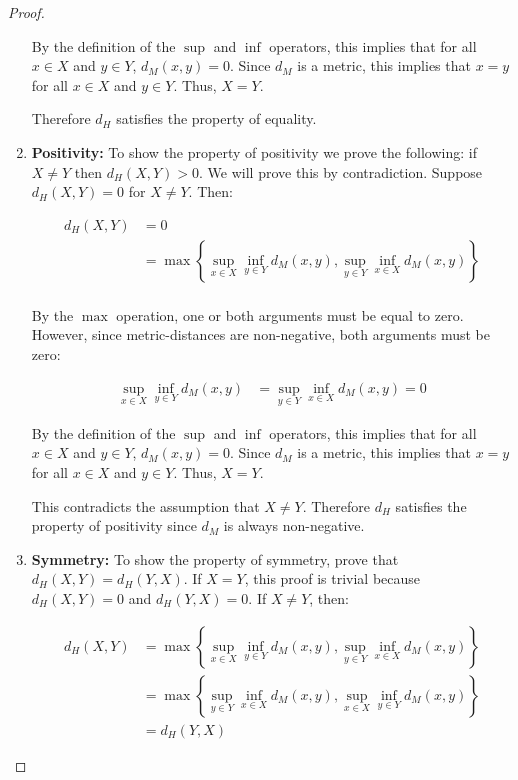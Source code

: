 \documentclass{article}
\begin{document}
\begin{proof}
\begin{enumerate}
        By the definition of the $\sup$ and $\inf$ operators, this implies that for all $x \in X$ and $y \in Y$, $d_M(x,y) = 0$. Since $d_M$ is a metric, this implies that $x=y$ for all $x \in X$ and $y \in Y$. Thus, $X=Y$.

        Therefore $d_H$ satisfies the property of equality.

    \item \textbf{Positivity:}
        To show the property of positivity we prove the following: if $X \neq Y$ then $d_H(X,Y) > 0$. We will prove this by contradiction. Suppose $d_H(X,Y) = 0$ for $X \neq Y$. Then:

        \begin{align*}
            d_H(X,Y) &= 0 \\
            &= \max \left\{ \sup_{x \in X} \inf_{y \in Y} d_M(x,y), \sup_{y \in Y} \inf_{x \in X} d_M(x,y) \right\} \\
        \end{align*}

        By the $\max$ operation, one or both arguments must be equal to zero. However, since metric-distances are non-negative, both arguments must be zero:

        \begin{align*}
            \sup_{x \in X} \inf_{y \in Y} d_M(x,y) &= \sup_{y \in Y} \inf_{x \in X} d_M(x,y) = 0
        \end{align*}

        By the definition of the $\sup$ and $\inf$ operators, this implies that for all $x \in X$ and $y \in Y$, $d_M(x,y) = 0$. Since $d_M$ is a metric, this implies that $x=y$ for all $x \in X$ and $y \in Y$. Thus, $X=Y$.

        This contradicts the assumption that $X \neq Y$. Therefore $d_H$ satisfies the property of positivity since $d_M$ is always non-negative.
    
    \item \textbf{Symmetry:}
        To show the property of symmetry, prove that $d_H(X,Y) = d_H(Y,X)$. If $X = Y$, this proof is trivial because $d_H(X,Y) = 0$ and $d_H(Y,X) =0$. If $X \neq Y$, then:

        \begin{align*}
            d_H(X,Y) &= \max \left\{ \sup_{x \in X} \inf_{y \in Y} d_M(x,y), \sup_{y \in Y} \inf_{x \in X} d_M(x,y) \right\} \\
            &= \max \left\{ \sup_{y \in Y} \inf_{x \in X} d_M(x,y), \sup_{x \in X} \inf_{y \in Y} d_M(x,y) \right\} \\
            &= d_H(Y,X)
        \end{align*}


\end{enumerate}
\end{proof}
\end{document}
